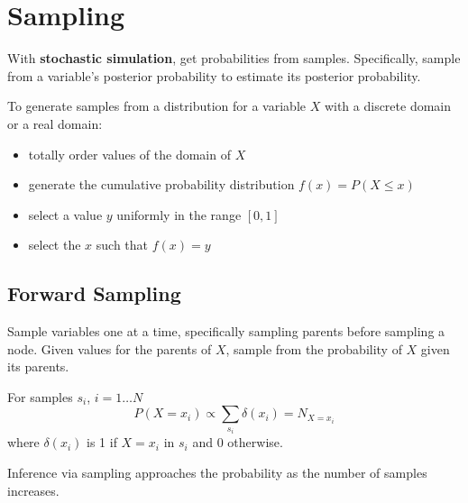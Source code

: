 \documentclass[11pt]{article}
\begin{document}
\section{Sampling}
\label{sec:org544a756}
With \textbf{stochastic simulation}, get probabilities from samples.
Specifically, sample from a variable's posterior probability to estimate its posterior
probability.

To generate samples from a distribution for a variable \(X\) with a discrete domain or a real
domain:
\begin{itemize}
\item totally order values of the domain of \(X\)
\item generate the cumulative probability distribution \(f(x) = P(X \le x)\)
\item select a value \(y\) uniformly in the range \([0, 1]\)
\item select the \(x\) such that \(f(x) = y\)
\end{itemize}
\subsection{Forward Sampling}
\label{sec:org7b18bf8}
Sample variables one at a time, specifically sampling parents before sampling a node.
Given values for the parents of \(X\), sample from the probability of \(X\) given its parents.

For samples \(s_{i}\), \(i = 1 \dots N\)
$$ P(X = x_{i}) \propto \sum_{s_{i}} \delta (x_{i}) = N_{X=x_{i}} $$
where \(\delta(x_{i})\) is 1 if \(X = x_{i}\) in \(s_{i}\) and 0 otherwise.

Inference via sampling approaches the probability as the number of samples increases.
\end{document}
